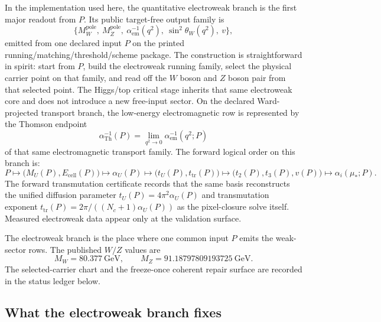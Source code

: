 \documentclass[11pt]{article}
\begin{document}
In the implementation used here, the quantitative electroweak branch is the first major readout from \(P\). Its public
target-free output family is
\[
\{M_W^{\mathrm{pole}},\ M_Z^{\mathrm{pole}},\ \alpha_{\mathrm{em}}^{-1}(q^2),\ \sin^2\theta_W(q^2),\ v\},
\]
emitted from one declared input \(P\) on the printed running/matching/threshold/scheme package. The construction
is straightforward in spirit: start from \(P\), build the electroweak running family, select the physical carrier point on that family, and read off the \(W\) boson and \(Z\) boson pair from that selected point. The Higgs/top critical stage
inherits that same electroweak core and does not introduce a new
free-input sector. On the declared Ward-projected transport branch, the low-energy electromagnetic row is represented by the Thomson endpoint
\[
\alpha_{\mathrm{Th}}^{-1}(P)=\lim_{q^2\to 0}\alpha_{\mathrm{em}}^{-1}(q^2;P)
\]
of that same electromagnetic transport family.
The forward logical order on this branch is:
\[
P
\longmapsto
\bigl(M_U(P),E_{\mathrm{cell}}(P)\bigr)
\longmapsto
\alpha_U(P)
\longmapsto
\bigl(t_U(P),t_{\mathrm{tr}}(P)\bigr)
\longmapsto
\bigl(t_2(P),t_3(P),v(P)\bigr)
\longmapsto
\alpha_i(\mu_\ast;P).
\]
The forward transmutation certificate records that the same basis reconstructs the unified diffusion parameter \(t_U(P)=4\pi^2\alpha_U(P)\) and transmutation exponent \(t_{\mathrm{tr}}(P)=2\pi/((N_c+1)\alpha_U(P))\) as the pixel-closure solve itself. Measured electroweak data appear only at the validation surface.

The electroweak branch is the place where one common input \(P\) emits the weak-sector rows. The
published \(W/Z\) values are
\[
M_W=80.377~\mathrm{GeV},
\qquad
M_Z=91.18797809193725~\mathrm{GeV}.
\]
The selected-carrier chart and the freeze-once coherent repair surface are recorded in the status
ledger below.

\subsection{What the electroweak branch fixes}
\end{document}
